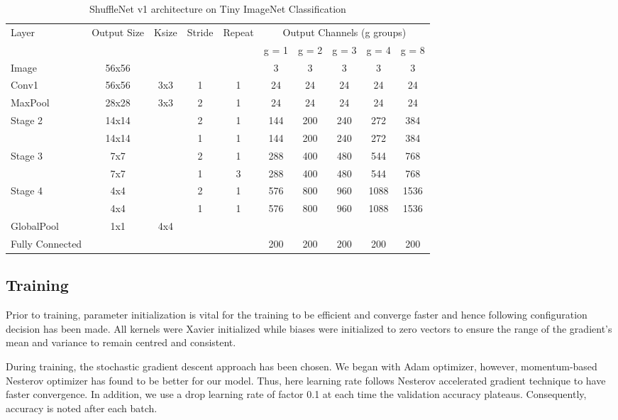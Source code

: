 \documentclass{article}
\begin{document}
\begin{table}[H]
  \caption{ShuffleNet v1 architecture on Tiny ImageNet Classification}
  \label{sample-table}
  \centering
  \begin{tabular}{lccccccccc}
    \toprule
    Layer & Output Size & Ksize & Stride & Repeat & \multicolumn{5}{c}{Output Channels (g groups)}   \\
     & & & & & g = 1 & g = 2 & g = 3 & g = 4 & g = 8 \\
    \midrule
    Image & 56x56 &  &  &  & 3 & 3 & 3 & 3 & 3  \\
    \midrule
    Conv1 & 56x56 & 3x3 & 1 & 1 & 24 & 24 & 24 & 24 & 24   \\
    MaxPool & 28x28 & 3x3 & 2 & 1 & 24 & 24 & 24 & 24 & 24   \\
    \midrule
    Stage 2 & 14x14 &  & 2 & 1 & 144 & 200 & 240 & 272 & 384 \\
     & 14x14 & & 1 & 1 & 144 & 200 & 240 & 272 & 384 \\
    \midrule
    Stage 3 & 7x7 &  & 2 & 1 & 288 & 400 & 480 & 544 & 768 \\
     & 7x7 & & 1 & 3 & 288 & 400 & 480 & 544 & 768 \\
    \midrule
    Stage 4 & 4x4 &  & 2 & 1 & 576 & 800 & 960 & 1088 & 1536\\
     & 4x4 & & 1 & 1 & 576 & 800 & 960 & 1088 & 1536 \\
    \midrule
    GlobalPool & 1x1 & 4x4 & & & & & & \\
    \midrule
    Fully Connected & & & & & 200 & 200 & 200 & 200 & 200 \\
    \bottomrule
  \end{tabular}
\end{table}

\subsection{Training}
Prior to training, parameter initialization is vital for the training to be efficient and converge faster and hence following configuration decision has been made. All kernels were Xavier initialized while biases were initialized to zero vectors to ensure the range of the gradient's mean and variance to remain centred and consistent.
 
During training, the stochastic gradient descent approach has been chosen. We began with Adam optimizer, however, momentum-based Nesterov optimizer has found to be better for our model. Thus, here learning rate follows Nesterov accelerated gradient technique to have faster convergence. In addition, we use a drop learning rate of factor 0.1 at each time the validation accuracy plateaus. Consequently, accuracy is noted after each batch.
\end{document}
